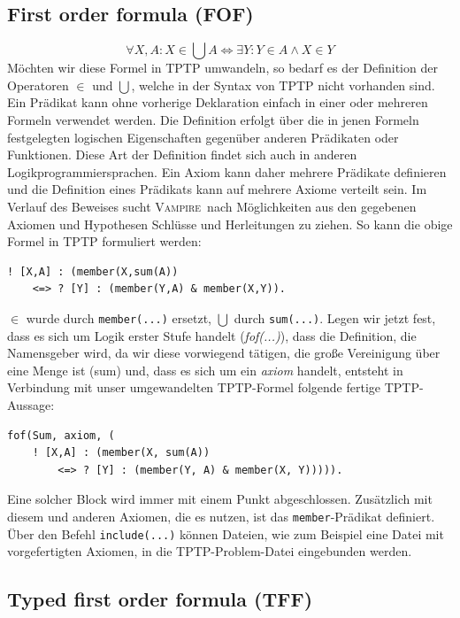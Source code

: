 \documentclass{article}
\newcommand{\vampire}{\textsc{Vampire}~}
\begin{document}
\subsection{First order formula (FOF)}
\label{subsec:tptpfof}
\[\forall X,A : X \in \bigcup A \Leftrightarrow \exists Y : Y \in A \land X \in Y\]
Möchten wir diese Formel in TPTP umwandeln,
so bedarf es der Definition der Operatoren $\in$ und $\bigcup$, welche in der Syntax von TPTP 
nicht vorhanden sind.
Ein Prädikat kann ohne vorherige Deklaration einfach in einer oder mehreren Formeln 
verwendet werden. 
Die Definition erfolgt über die in jenen Formeln festgelegten logischen Eigenschaften gegenüber 
anderen Prädikaten oder Funktionen. Diese Art der Definition findet sich auch in anderen
Logikprogrammiersprachen.
Ein Axiom kann daher mehrere Prädikate definieren und die Definition eines Prädikats kann 
auf mehrere Axiome verteilt sein.
Im Verlauf des Beweises sucht \vampire nach Möglichkeiten aus den gegebenen Axiomen und Hypothesen Schlüsse und Herleitungen zu ziehen.
So kann die obige Formel in TPTP formuliert werden:
\begin{lstlisting}[language=tptp]
! [X,A] : (member(X,sum(A))
	<=> ? [Y] : (member(Y,A) & member(X,Y)).
\end{lstlisting}
$\in$ wurde durch \verb=member(...)= ersetzt, $\bigcup$ durch \verb=sum(...)=.
Legen wir jetzt fest, dass es sich um Logik erster Stufe handelt (\textit{fof(...)}), dass die Definition, 
die Namensgeber wird, da wir diese vorwiegend tätigen, die große Vereinigung über eine Menge ist (sum) und, dass es sich um ein \textit{axiom} handelt,
entsteht in Verbindung mit unser umgewandelten TPTP-Formel folgende fertige TPTP-Aussage:
\begin{lstlisting}[language=tptp]
fof(Sum, axiom, (	
	! [X,A] : (member(X, sum(A)) 
		<=> ? [Y] : (member(Y, A) & member(X, Y))))).
\end{lstlisting}
Eine solcher Block wird immer mit einem Punkt abgeschlossen.
Zusätzlich mit diesem und anderen Axiomen, die es nutzen, ist das \verb=member=-Prädikat definiert.
Über den Befehl \verb|include(...)| können Dateien, wie zum Beispiel eine Datei mit vorgefertigten Axiomen, in die TPTP-Problem-Datei eingebunden werden. \cite[S. 4-5]{cav2013}

\subsection{Typed first order formula (TFF)}
\label{subsec:tptptff}
\end{document}
